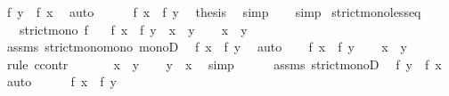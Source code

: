 \begin{isabellebody}
\ {\isachardoublequoteopen}f\ y\ {\isacharless}{\kern0pt}\ f\ x{\isachardoublequoteclose}\ \isamarkupfalse%
\ auto\isanewline
\ \ \ \ \isamarkupfalse%
\ {\isacartoucheopen}f\ x\ {\isacharequal}{\kern0pt}\ f\ y{\isacartoucheclose}\ \isamarkupfalse%
\ {\isacharquery}{\kern0pt}thesis\ \isamarkupfalse%
\ simp\isanewline
\ \ \isamarkupfalse%
\isanewline
{}\isamarkupfalse%
\ simp%
\endisatagproof
{\isafoldproof}%
%
\isadelimproof
\isanewline
%
\endisadelimproof
\isanewline
{}\isamarkupfalse%
\ strict{\isacharunderscore}{\kern0pt}mono{\isacharunderscore}{\kern0pt}less{\isacharunderscore}{\kern0pt}eq{\isacharcolon}{\kern0pt}\isanewline
\ \ \ {\isachardoublequoteopen}strict{\isacharunderscore}{\kern0pt}mono\ f{\isachardoublequoteclose}\isanewline
\ \ \ {\isachardoublequoteopen}f\ x\ {\isasymle}\ f\ y\ {\isasymlongleftrightarrow}\ x\ {\isasymle}\ y{\isachardoublequoteclose}\isanewline
%
\isadelimproof
%
\endisadelimproof
%
\isatagproof
{}\isamarkupfalse%
\isanewline
\ \ \isamarkupfalse%
\ {\isachardoublequoteopen}x\ {\isasymle}\ y{\isachardoublequoteclose}\isanewline
\ \ \isamarkupfalse%
\ assms\ strict{\isacharunderscore}{\kern0pt}mono{\isacharunderscore}{\kern0pt}mono\ monoD\ \isamarkupfalse%
\ {\isachardoublequoteopen}f\ x\ {\isasymle}\ f\ y{\isachardoublequoteclose}\ \isamarkupfalse%
\ auto\isanewline
{}\isamarkupfalse%
\isanewline
\ \ \isamarkupfalse%
\ {\isachardoublequoteopen}f\ x\ {\isasymle}\ f\ y{\isachardoublequoteclose}\isanewline
\ \ \isamarkupfalse%
\ {\isachardoublequoteopen}x\ {\isasymle}\ y{\isachardoublequoteclose}\ \isamarkupfalse%
\ {\isacharparenleft}{\kern0pt}rule\ ccontr{\isacharparenright}{\kern0pt}\isanewline
\ \ \ \ \isamarkupfalse%
\ {\isachardoublequoteopen}{\isasymnot}\ x\ {\isasymle}\ y{\isachardoublequoteclose}\ \isamarkupfalse%
\ \isamarkupfalse%
\ {\isachardoublequoteopen}y\ {\isacharless}{\kern0pt}\ x{\isachardoublequoteclose}\ \isamarkupfalse%
\ simp\isanewline
\ \ \ \ \isamarkupfalse%
\ assms\ strict{\isacharunderscore}{\kern0pt}monoD\ \isamarkupfalse%
\ {\isachardoublequoteopen}f\ y\ {\isacharless}{\kern0pt}\ f\ x{\isachardoublequoteclose}\ \isamarkupfalse%
\ auto\isanewline
\ \ \ \ \isamarkupfalse%
\ {\isacartoucheopen}f\ x\ {\isasymle}\ f\ y{\isacartoucheclose}\ \isamarkupfalse%

\end{isabellebody}

